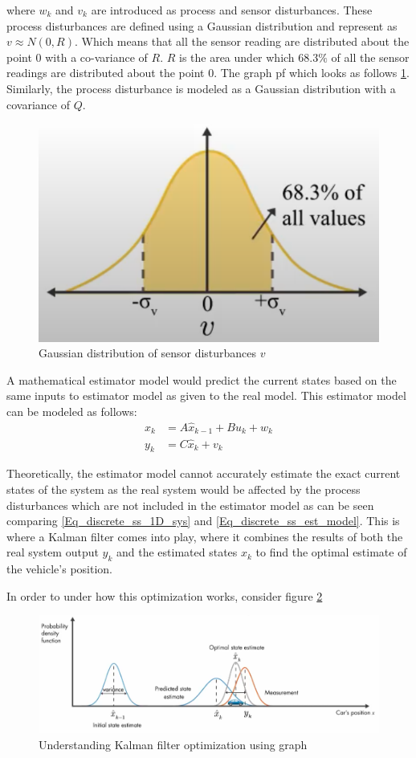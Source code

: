 where $w_{k}$ and $v_{k}$ are introduced as process and sensor disturbances. These process disturbances are defined using a Gaussian distribution and represent as $v \approx N(0, R)$. Which means that all the sensor reading are distributed about the point $0$ with a co-variance of $R$. $R$ is the area under which $68.3\%$ of all the sensor readings are distributed about the point $0$. The graph pf which looks as follows \ref{fig_Gaussian_dist_v}. Similarly, the process disturbance is modeled as a Gaussian distribution with a covariance of $Q$.
\begin{figure}[h!]
	\centering
	\includegraphics[width=0.5\linewidth]{Bilder/Gaussian_distrubution_v.PNG}
	\caption{Gaussian distribution of sensor disturbances $v$}
	\label{fig_Gaussian_dist_v}
\end{figure}

A mathematical estimator model would predict the current states based on the same inputs to estimator model as given to the real model. This estimator model can be modeled as follows:
\begin{align}
	x_{k} &= A \hat{x}_{k-1} + B u_{k} + w_{k} \label{Eq_discrete_ss_est_model} \\
	y_{k} &= C \hat{x}_{k} + v_{k}
\end{align}

Theoretically, the estimator model cannot accurately estimate the exact current states of the system as the real system would be affected by the process disturbances which are not included in the estimator model as can be seen comparing \ref{Eq_discrete_ss_1D_sys} and \eqref{Eq_discrete_ss_est_model}. This is where a Kalman filter comes into play, where it combines the results of both the real system output $y_{k}$ and the estimated states $\hat{x}_{k}$ to find the optimal estimate of the vehicle's position.

In order to under how this optimization works, consider figure \ref{fig_kal_filter_opt_frm_graph}
\begin{figure}[h!]
	\centering
	\includegraphics[width=\linewidth]{Bilder/Probabiity_density_fcn.png}
	\caption{Understanding Kalman filter optimization using graph}
	\label{fig_kal_filter_opt_frm_graph}
\end{figure} 

